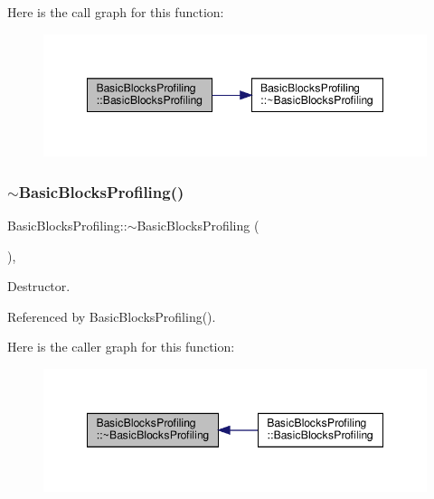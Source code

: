 Here is the call graph for this function\+:
\nopagebreak
\begin{figure}[H]
\begin{center}
\leavevmode
\includegraphics[width=348pt]{dc/d17/classBasicBlocksProfiling_ac41d9051359b6628669b6a6dad477d41_cgraph}
\end{center}
\end{figure}
\mbox{\label{classBasicBlocksProfiling_abb7c76103ba3c784570f8eeba3019659}} 
\subsubsection{\texorpdfstring{$\sim$\+Basic\+Blocks\+Profiling()}{~BasicBlocksProfiling()}}
{\footnotesize\ttfamily Basic\+Blocks\+Profiling\+::$\sim$\+Basic\+Blocks\+Profiling (\begin{DoxyParamCaption}{ }\end{DoxyParamCaption})\hspace{0.3cm}{\ttfamily [override]}, {\ttfamily [default]}}



Destructor. 



Referenced by Basic\+Blocks\+Profiling().

Here is the caller graph for this function\+:
\nopagebreak
\begin{figure}[H]
\begin{center}
\leavevmode
\includegraphics[width=348pt]{dc/d17/classBasicBlocksProfiling_abb7c76103ba3c784570f8eeba3019659_icgraph}
\end{center}
\end{figure}


